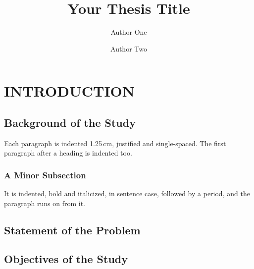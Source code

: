 \documentclass[12pt,a4paper]{article}
\title{Your Thesis Title}
\author{Author One \and Author Two}
\date{}
\begin{document}


\section{INTRODUCTION}
\label{sec:intro}

\subsection{Background of the Study}          %
\label{sec:background}

Each paragraph is indented 1.25\,cm, justified and single-spaced. The first
paragraph after a heading is indented too.

\subsubsection{A Minor Subsection}            %

 It is indented, bold and italicized, in sentence
case, followed by a period, and the paragraph runs on from it.

\subsection{Statement of the Problem}
\subsection{Objectives of the Study}
\end{document}
